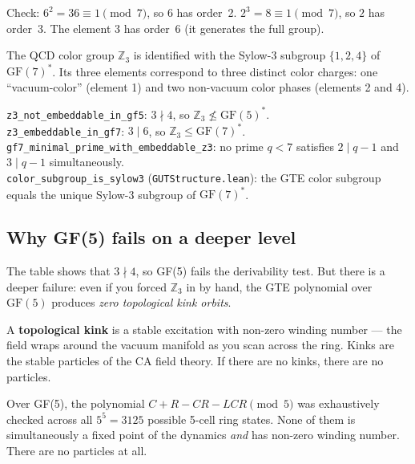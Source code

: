 \documentclass[11pt,a4paper]{article}
\newcommand{\term}[1]{\textbf{#1}}
\newcommand{\lean}[1]{\texttt{#1}}
\newcommand{\CatAL}{\textbf{CatAL}}
\theoremstyle{definition}
\begin{document}
\bigskip
Check: $6^2 = 36 \equiv 1 \pmod 7$, so $6$ has order~2.
$2^3 = 8 \equiv 1 \pmod 7$, so $2$ has order~3.
The element $3$ has order~6 (it generates the full group).

The QCD color group $\mathbb{Z}_3$ is identified with the Sylow-3 subgroup
$\{1, 2, 4\}$ of $\mathrm{GF}(7)^*$.  Its three elements correspond to three
distinct color charges: one ``vacuum-color'' (element 1) and two non-vacuum
color phases (elements 2 and 4).

\begin{tcolorbox}[colback=boxorange,colframe=orange!60!black,
  title={Lean certifications (\CatAL, zero sorry, \texttt{MDLDerivabilityCriterion.lean}, ugp-lean)}]
\lean{z3\_not\_embeddable\_in\_gf5}: $3 \nmid 4$, so $\mathbb{Z}_3 \not\leq \mathrm{GF}(5)^*$.\\[3pt]
\lean{z3\_embeddable\_in\_gf7}: $3 \mid 6$, so $\mathbb{Z}_3 \leq \mathrm{GF}(7)^*$.\\[3pt]
\lean{gf7\_minimal\_prime\_with\_embeddable\_z3}: no prime $q < 7$ satisfies
$2 \mid q-1$ and $3 \mid q-1$ simultaneously.\\[3pt]
\lean{color\_subgroup\_is\_sylow3} (\texttt{GUTStructure.lean}):
the GTE color subgroup equals the unique Sylow-3 subgroup of $\mathrm{GF}(7)^*$.
\end{tcolorbox}

\subsection{Why GF(5) fails on a deeper level}

The table shows that $3 \nmid 4$, so GF(5) fails the derivability test.
But there is a deeper failure: even if you forced $\mathbb{Z}_3$ in by hand,
the GTE polynomial over $\mathrm{GF}(5)$ produces \emph{zero topological
kink orbits}.

A \term{topological kink} is a stable excitation with non-zero winding
number — the field wraps around the vacuum manifold as you scan across the
ring.  Kinks are the stable particles of the CA field theory.
If there are no kinks, there are no particles.

Over GF(5), the polynomial $C + R - CR - LCR \pmod 5$ was exhaustively
checked across all $5^5 = 3125$ possible 5-cell ring states.  None of them
is simultaneously a fixed point of the dynamics \emph{and} has non-zero
winding number.  There are no particles at all.
\end{document}
